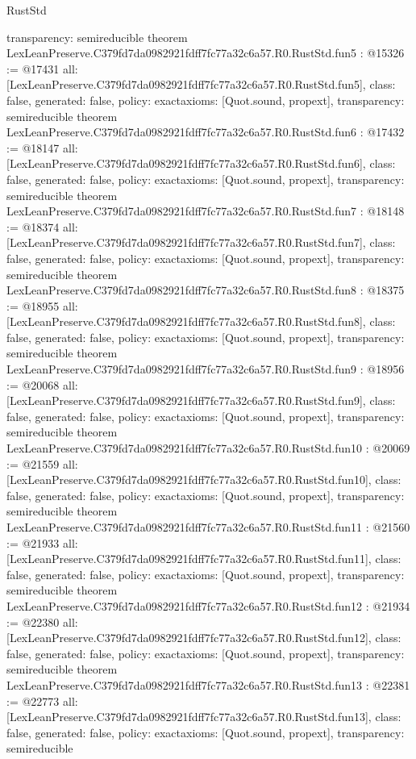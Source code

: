 \begin{lexlean}{RustStd}
\begin{coremodule}
{  transparency: semireducible
}
theorem LexLeanPreserve.C379fd7da0982921fdff7fc77a32c6a57.R0.RustStd.fun5 : @15326 := @17431 {
  all: [LexLeanPreserve.C379fd7da0982921fdff7fc77a32c6a57.R0.RustStd.fun5],
  class: false,
  generated: false,
  policy: exact{axioms: [Quot.sound, propext]},
  transparency: semireducible
}
theorem LexLeanPreserve.C379fd7da0982921fdff7fc77a32c6a57.R0.RustStd.fun6 : @17432 := @18147 {
  all: [LexLeanPreserve.C379fd7da0982921fdff7fc77a32c6a57.R0.RustStd.fun6],
  class: false,
  generated: false,
  policy: exact{axioms: [Quot.sound, propext]},
  transparency: semireducible
}
theorem LexLeanPreserve.C379fd7da0982921fdff7fc77a32c6a57.R0.RustStd.fun7 : @18148 := @18374 {
  all: [LexLeanPreserve.C379fd7da0982921fdff7fc77a32c6a57.R0.RustStd.fun7],
  class: false,
  generated: false,
  policy: exact{axioms: [Quot.sound, propext]},
  transparency: semireducible
}
theorem LexLeanPreserve.C379fd7da0982921fdff7fc77a32c6a57.R0.RustStd.fun8 : @18375 := @18955 {
  all: [LexLeanPreserve.C379fd7da0982921fdff7fc77a32c6a57.R0.RustStd.fun8],
  class: false,
  generated: false,
  policy: exact{axioms: [Quot.sound, propext]},
  transparency: semireducible
}
theorem LexLeanPreserve.C379fd7da0982921fdff7fc77a32c6a57.R0.RustStd.fun9 : @18956 := @20068 {
  all: [LexLeanPreserve.C379fd7da0982921fdff7fc77a32c6a57.R0.RustStd.fun9],
  class: false,
  generated: false,
  policy: exact{axioms: [Quot.sound, propext]},
  transparency: semireducible
}
theorem LexLeanPreserve.C379fd7da0982921fdff7fc77a32c6a57.R0.RustStd.fun10 : @20069 := @21559 {
  all: [LexLeanPreserve.C379fd7da0982921fdff7fc77a32c6a57.R0.RustStd.fun10],
  class: false,
  generated: false,
  policy: exact{axioms: [Quot.sound, propext]},
  transparency: semireducible
}
theorem LexLeanPreserve.C379fd7da0982921fdff7fc77a32c6a57.R0.RustStd.fun11 : @21560 := @21933 {
  all: [LexLeanPreserve.C379fd7da0982921fdff7fc77a32c6a57.R0.RustStd.fun11],
  class: false,
  generated: false,
  policy: exact{axioms: [Quot.sound, propext]},
  transparency: semireducible
}
theorem LexLeanPreserve.C379fd7da0982921fdff7fc77a32c6a57.R0.RustStd.fun12 : @21934 := @22380 {
  all: [LexLeanPreserve.C379fd7da0982921fdff7fc77a32c6a57.R0.RustStd.fun12],
  class: false,
  generated: false,
  policy: exact{axioms: [Quot.sound, propext]},
  transparency: semireducible
}
theorem LexLeanPreserve.C379fd7da0982921fdff7fc77a32c6a57.R0.RustStd.fun13 : @22381 := @22773 {
  all: [LexLeanPreserve.C379fd7da0982921fdff7fc77a32c6a57.R0.RustStd.fun13],
  class: false,
  generated: false,
  policy: exact{axioms: [Quot.sound, propext]},
  transparency: semireducible
}
\end{coremodule}
\end{lexlean}
